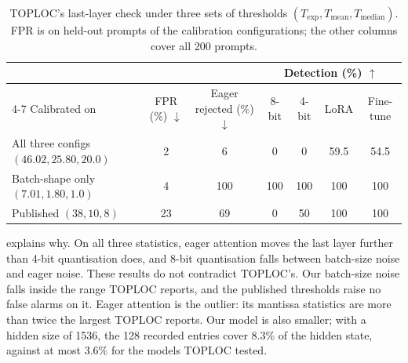 \documentclass[10pt,twocolumn]{article}
\newcommand{\best}[1]{\cellcolor{blue!8}#1}
\newcommand{\up}{$\uparrow$}
\newcommand{\down}{$\downarrow$}
\begin{document}
\begin{table}[!t]
\centering
\small
\caption{TOPLOC's last-layer check under three sets of thresholds $(T_{\exp}, T_{\text{mean}}, T_{\text{median}})$. FPR is on held-out prompts of the calibration configurations; the other columns cover all 200 prompts.}
\label{tab:recal}
\begin{tabular}{@{}lcccccc@{}}
\toprule
 & & & \multicolumn{4}{c}{Detection (\%) \up} \\
\cmidrule(l){4-7}
Calibrated on & FPR (\%) \down & Eager rejected (\%) \down & 8-bit & 4-bit & LoRA & Fine-tune \\
\midrule
All three configs $(46.02, 25.80, 20.0)$ & \best{2}  & \best{6}  & 0   & 0   & 59.5 & 54.5 \\
Batch-shape only $(7.01, 1.80, 1.0)$    & 4         & 100       & \best{100} & \best{100} & \best{100} & \best{100} \\
Published $(38, 10, 8)$                 & 23        & 69        & 0   & 50  & \best{100} & \best{100} \\
\bottomrule
\end{tabular}
\end{table}

 explains why.
On all three statistics, eager attention moves the last layer further than 4-bit quantisation does, and 8-bit quantisation falls between batch-size noise and eager noise.
These results do not contradict TOPLOC's.
Our batch-size noise falls inside the range TOPLOC reports, and the published thresholds raise no false alarms on it.
Eager attention is the outlier: its mantissa statistics are more than twice the largest TOPLOC reports.
Our model is also smaller; with a hidden size of 1536, the 128 recorded entries cover 8.3\% of the hidden state, against at most 3.6\% for the models TOPLOC tested.
\end{document}
